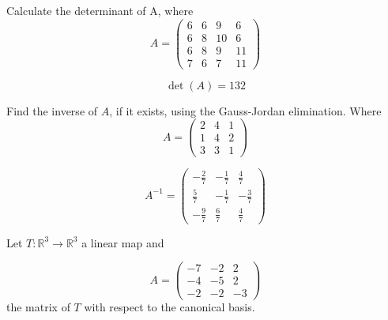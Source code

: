 \begin{questions}

\question Calculate the determinant of A, where
$$
A=\left(\begin{array}{rrrr}
6 & 6 & 9 & 6 \\
6 & 8 & 10 & 6 \\
6 & 8 & 9 & 11 \\
7 & 6 & 7 & 11
\end{array}\right)
$$

\begin{solution}
$$\det(A)=132$$
\end{solution}

\question Find the inverse of $A$, if it exists, using the Gauss-Jordan elimination. Where
$$
A=\left(\begin{array}{rrr}
2 & 4 & 1 \\
1 & 4 & 2 \\
3 & 3 & 1
\end{array}\right)
$$

\begin{solution}
$$A^{-1}=\left(\begin{array}{rrr}
-\frac{2}{7} & -\frac{1}{7} & \frac{4}{7} \\
\frac{5}{7} & -\frac{1}{7} & -\frac{3}{7} \\
-\frac{9}{7} & \frac{6}{7} & \frac{4}{7}
\end{array}\right)$$
\end{solution}

\question Let $T:\mathbb{R}^3\rightarrow\mathbb{R}^3$  a linear map and
 
$$
A=\left(\begin{array}{rrr}
-7 & -2 & 2 \\
-4 & -5 & 2 \\
-2 & -2 & -3
\end{array}\right)
$$
the matrix of $T$ with respect to the canonical basis.
\end{questions}
